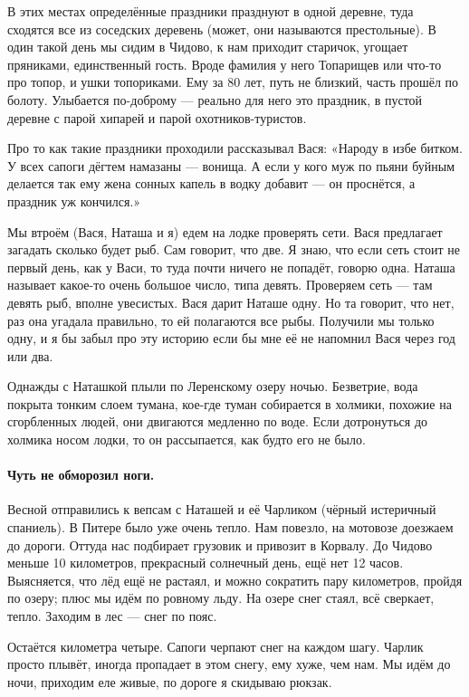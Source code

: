 \documentclass{book}
\begin{document}
В этих местах определённые праздники празднуют в одной деревне, туда сходятся все из соседских деревень (может, они называются престольные).
В один такой день мы сидим в Чидово, к нам приходит старичок, угощает пряниками, единственный гость.
Вроде фамилия у него Топарищев или что-то про топор, и ушки топориками.
Ему за 80 лет, путь не близкий, часть прошёл по болоту.
Улыбается по-доброму --- реально для него это праздник, в пустой деревне с парой хипарей и парой охотников-туристов.

Про то как такие праздники проходили рассказывал Вася:
«Народу в избе битком. 
У всех сапоги дёгтем намазаны --- вонища.
А если у кого муж по пьяни буйным делается так ему жена сонных капель в водку добавит --- он проснётся, а праздник уж кончился.»

Мы втроём (Вася, Наташа и я) едем на лодке проверять сети.
Вася предлагает загадать сколько будет рыб.
Сам говорит, что две.
Я знаю, что если сеть стоит не первый день, как у Васи, то туда почти ничего не попадёт, говорю одна.
Наташа называет какое-то очень большое число, типа девять.
Проверяем сеть --- там девять рыб, вполне увесистых.
Вася дарит Наташе одну.
Но та говорит, что нет, раз она угадала правильно, то ей полагаются все рыбы.
Получили мы только одну, и я бы забыл про эту историю если бы мне её не напомнил Вася через год или два.

Однажды с Наташкой плыли по Леренскому озеру ночью.
Безветрие, вода покрыта тонким слоем тумана, кое-где туман собирается в холмики, похожие на сгорбленных людей, они двигаются медленно по воде.
Если дотронуться до холмика носом лодки, то он рассыпается, как будто его не было.

\paragraph{Чуть не обморозил ноги.}

Весной отправились к вепсам с Наташей и её Чарликом (чёрный истеричный спаниель).
В Питере было уже очень тепло.
Нам повезло, на мотовозе доезжаем до дороги.
Оттуда нас подбирает грузовик и привозит в Корвалу.
До Чидово меньше 10 километров, прекрасный солнечный день, ещё нет 12 часов.
Выясняется, что лёд ещё не растаял, и можно сократить пару километров, пройдя по озеру;
плюс мы идём по ровному льду.
На озере снег стаял, всё сверкает, тепло.
Заходим в лес --- снег по пояс.

Остаётся километра четыре.
Сапоги черпают снег на каждом шагу.
Чарлик  просто плывёт, иногда пропадает в этом снегу, ему хуже, чем нам.
Мы идём до ночи, приходим еле живые, по дороге я скидываю рюкзак.
\end{document}
